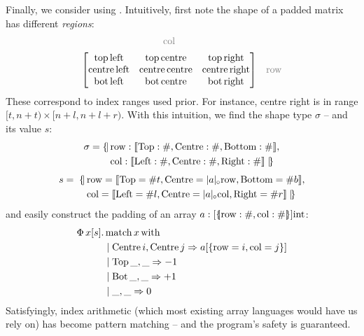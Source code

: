 \needspace{3em}
\noindent
Finally, we consider using \starr{}. Intuitively, first note the shape of a padded matrix has different \textit{regions}: \\[-0.5em]
$$
\begin{matrix}
{\color{gray} \mathrm{col}} & \\[0.5em]
\begin{bmatrix}
\mathrm{top\, left} & \mathrm{top\, centre} & \mathrm{top\, right} \\
\mathrm{centre\, left} & \mathrm{centre\, centre} & \mathrm{centre\, right} \\
\mathrm{bot\, left} & \mathrm{bot\, centre} & \mathrm{bot\, right} \\
\end{bmatrix} & {\color{gray} \mathrm{row}} 
\end{matrix} $$
These correspond to index ranges used prior. For instance, centre right is in range $[t, n + t) \times [n + l, n + l + r)$.
With this intuition, we find the \starr{} shape type $\sigma$ -- and its value $s$:
\begin{align*}
\sigma =  \{\!\mid &\, \mathrm{row}: \sconcattype{\mathrm{Top}: \ssized, \mathrm{Centre}: \ssized,\mathrm{Bottom}: \ssized}, \\ 
&\, \mathrm{col} : \sconcattype{\mathrm{Left}: \ssized, \mathrm{Centre}: \ssized,\mathrm{Right}: \ssized} \mid\!\} 
\end{align*}
\vspace{-2em}
\begin{align*}
s =\; \{\!\mid &\,\mathrm{row}= \sconcatval{\mathrm{Top}= \ssize t, \mathrm{Centre}= \sproductproj{\sshape{a}}{\mathrm{row}}, \mathrm{Bottom}= \ssize b}, \\ 
&\,\mathrm{col}= \sconcatval{ \mathrm{Left}= \ssize l, \mathrm{Centre}= \sproductproj{\sshape{a}}{\mathrm{col}}, \mathrm{Right}= \ssize r} \mid\!\}
\end{align*}
and easily construct the padding of an array $a : [\sproducttype{\mathrm{row} : \ssized,\mathrm{col} : \ssized }] \mathrm{int} $:
\begin{align*}
\Phi\, x[s] \ldotp&\, \mathrm{match}\,x\,\mathrm{with} \\
&\mid \mathrm{Centre}\,i, \mathrm{Centre}\,j \Rightarrow a[\srecordval{ \mathrm{row}= i, \mathrm{col}= j }] \\
&\mid \mathrm{Top}\,\_, \_ \Rightarrow -1 \\
&\mid \mathrm{Bot}\,\_, \_ \Rightarrow +1  \\
&\mid \_, \_ \Rightarrow 0
\end{align*}
Satisfyingly, index arithmetic (which most existing array languages would have us rely on) has become pattern matching -- and the program's safety is guaranteed.

